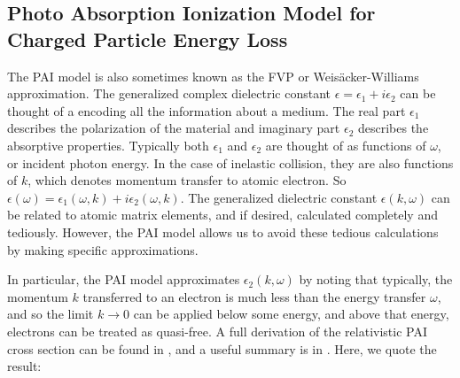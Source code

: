 \subsection{Photo Absorption Ionization Model for Charged Particle Energy Loss}
\label{sec:pai}
The \ac{PAI} model is also sometimes known as the \ac{FVP} or Weis\"{a}cker-Williams approximation. The generalized complex dielectric constant $\epsilon = \epsilon_{1} + i \epsilon_{2}$ can be thought of a encoding all the information about a medium. The real part $\epsilon_{1}$ describes the polarization of the material and imaginary part $\epsilon_{2}$ describes the absorptive properties. Typically both $\epsilon_{1}$ and $\epsilon_{2}$ are thought of as functions of $\omega$, or incident photon energy. In the case of inelastic collision, they are also functions of $k$, which denotes momentum transfer to atomic electron. So $\epsilon(\omega)  = \epsilon_{1}(\omega, k) + i \epsilon_{2}(\omega, k)$. The generalized dielectric constant $\epsilon(k, \omega)$ can be related to atomic matrix elements, and if desired, calculated completely and tediously. However, the \ac{PAI} model allows us to avoid these tedious calculations by making specific approximations.

In particular, the \ac{PAI} model approximates $\epsilon_{2}(k, \omega)$ by noting that typically, the momentum $k$ transferred to an electron is much less than the energy transfer $\omega$, and so the limit $k \rightarrow 0$ can be applied below some energy, and above that energy, electrons can be treated as quasi-free. A full derivation of the relativistic \ac{PAI} cross section can be found in \cite{AllisonCobb:1980}, and a useful summary is in \cite{Bichsel:2006}. Here, we quote the result:

